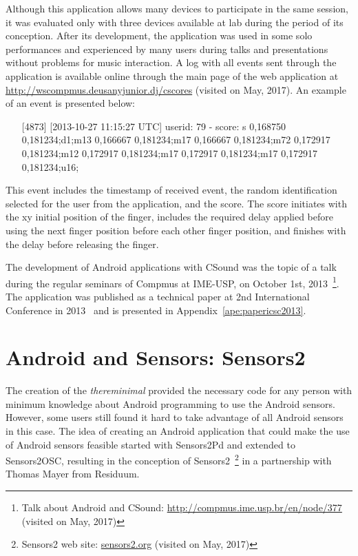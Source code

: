 Although this application allows many devices to participate in the same session, it was evaluated only with three devices available at lab during the period of its conception.
After its development, the application was used in some solo performances and experienced by many users during talks and presentations without problems for music interaction.
A log with all events sent through the application is available online through the main page of the web application at \url{http://wscompmus.deusanyjunior.dj/cscores} (visited on May, 2017).
An example of an event is presented below:

\begin{itemize}\itemsep0em
	\item[] [4873] [2013-10-27 11:15:27 UTC] userid: 79 - score: s 0,168750 0,181234;d1;m13 0,166667 0,181234;m17 0,166667 0,181234;m72 0,172917 0,181234;m12 0,172917 0,181234;m17 0,172917 0,181234;m17 0,172917 0,181234;u16;
\end{itemize}

This event includes the timestamp of received event, the random identification selected for the user from the application, and the score.
The score initiates with the xy initial position of the finger, includes the required delay applied before using the next finger position before each other finger position, and finishes with the delay before releasing the finger.

The development of Android applications with CSound was the topic of a talk during the regular seminars of Compmus at IME-USP, on October 1st, 2013~\footnote{Talk about Android and CSound: \url{http://compmus.ime.usp.br/en/node/377} (visited on May, 2017)}.
The application was published as a technical paper at 2nd International Conference in 2013~\citep{deCarvalhoJunior2013touches} and is presented in Appendix~\ref{ape:papericsc2013}.

\section{Android and Sensors: Sensors2}
\label{apesec:appsensors2}

The creation of the \textit{thereminimal} provided the necessary code for any person with minimum knowledge about Android programming to use the Android sensors.
However, some users still found it hard to take advantage of all Android sensors in this case.
The idea of creating an Android application that could make the use of Android sensors feasible started with Sensors2Pd and extended to Sensors2OSC, resulting in the conception of Sensors2~\footnote{Sensors2 web site: \url{sensors2.org} (visited on May, 2017)} in a partnership with Thomas Mayer from Residuum.

